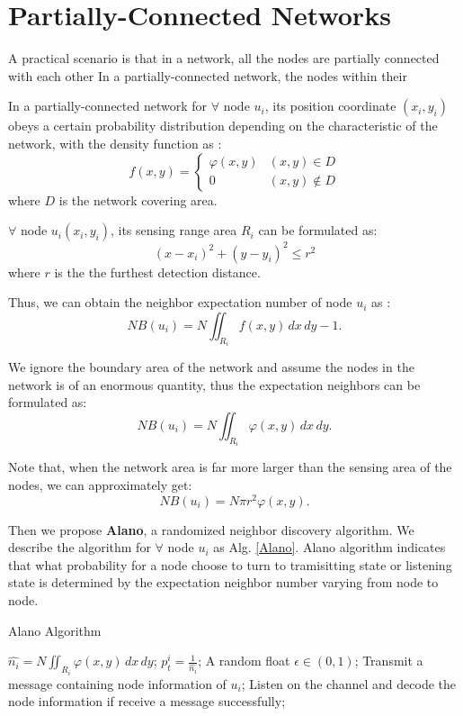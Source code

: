 \section{Partially-Connected Networks}
\label{PCN}



A practical scenario is that in a network,
all the nodes are partially connected with each other
In a partially-connected network, the nodes 
within their 


In a partially-connected network for $\forall$ node $u_i$, 
its position coordinate $(x_i,y_i)$
obeys a certain probability distribution depending on the 
characteristic of the network, with the density function as :
$$f(x,y)=
\begin{cases}
\varphi(x,y)& (x,y)\in D\\
0& (x,y)\notin D
\end{cases}$$
where $D$ is the network covering area.

$\forall$ node $u_i (x_i,y_i)$, its sensing range area $R_i$ can be formulated as:
$$
(x-x_i)^2+(y-y_i)^2 \leq r^2
$$
where $r$ is the the furthest detection distance.

Thus, we can obtain the neighbor expectation number of node $u_i$ as :
$$
NB(u_i) = N\iint_{R_i} f(x,y)\,dx\,dy - 1.
$$

We ignore the boundary area of the network and assume the
nodes in the network is of an enormous quantity, thus the 
expectation neighbors can be formulated as:
$$
NB(u_i) = N\iint_{R_i} \varphi(x,y)\,dx\,dy.
$$

Note that, when the network area is far more larger than the
sensing area of the nodes, we can approximately get:
$$
NB(u_i) = N\pi r^2 \varphi(x,y).
$$




Then we propose \textbf{Alano}, a randomized neighbor discovery algorithm. 
We describe the algorithm for $\forall$ node $u_i$ as Alg. \ref{Alano}.
Alano algorithm indicates that what probability for a node choose to turn to  
tramisitting state or listening state is determined
by the expectation neighbor number varying from node to node.


\begin{algorithm}
\caption{Alano Algorithm}
\label{Alano}
\begin{algorithmic}[1]
\STATE $\hat{n_i} = N\iint_{R_i} \varphi(x,y)\,dx\,dy$;
\STATE $p_t^i = \frac{1}{\hat{n_i}}$;
	\STATE A random float $\epsilon \in (0,1)$;
    		\STATE Transmit a message containing node information of $u_i$;
	\ELSE
    		\STATE Listen on the channel and decode the node information if receive a message successfully;
	\ENDIF
\ENDWHILE
\end{algorithmic}
\end{algorithm}

